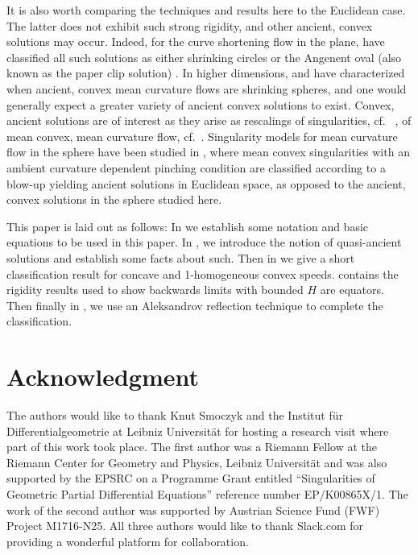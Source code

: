 \documentclass{amsart}
\begin{document}
It is also worth comparing the techniques and results here to the Euclidean case. The latter does not exhibit such strong rigidity, and other ancient, convex solutions may occur. Indeed, for the curve shortening flow in the plane, \cite{DaskalopoulosHamiltonSesum:2010} have classified all such solutions as either shrinking circles or the Angenent oval (also known as the paper clip solution) \cite{Angenent:1992}. In higher dimensions, \cite{HuiskenSinestrari:05/2014} and \cite{HaslhoferHershkovits:08/2013} have characterized when ancient, convex mean curvature flows are shrinking spheres, and one would generally expect a greater variety of ancient convex solutions to exist. Convex, ancient solutions are of interest as they arise as rescalings of singularities, cf.~ \cite{HuiskenSinestrari:01/1999}, of mean convex, mean curvature flow, cf.~\cite{HuiskenSinestrari:09/1999, White:10/2002}. Singularity models for mean curvature flow in the sphere have been studied in \cite{Nguyen:2015}, where mean convex singularities with an ambient curvature dependent pinching condition are classified according to a blow-up yielding ancient solutions in Euclidean space, as opposed to the ancient, convex solutions in the sphere studied here.

This paper is laid out as follows: In  we establish some notation and basic equations to be used in this paper. In , we introduce the notion of quasi-ancient solutions and establish some facts about such. Then in  we give a short classification result for concave and 1-homogeneous convex speeds.  contains the rigidity results used to show backwards limits with bounded \(H\) are equators. Then finally in , we use an Aleksandrov reflection technique to complete the classification.

\section*{Acknowledgment}
The authors would like to thank Knut Smoczyk and the Institut f\"{u}r Differentialgeometrie at Leibniz Universität for hosting a research visit where part of this work took place. The first author was a Riemann Fellow at the Riemann Center for Geometry and Physics, Leibniz Universit\"{a}t and was also supported by the EPSRC on a Programme Grant entitled ``Singularities of Geometric Partial Differential Equations'' reference number EP/K00865X/1. The work of the second author was supported by Austrian Science Fund (FWF) Project M1716-N25. All three authors would like to thank Slack.com for providing a wonderful platform for collaboration. 
\end{document}
